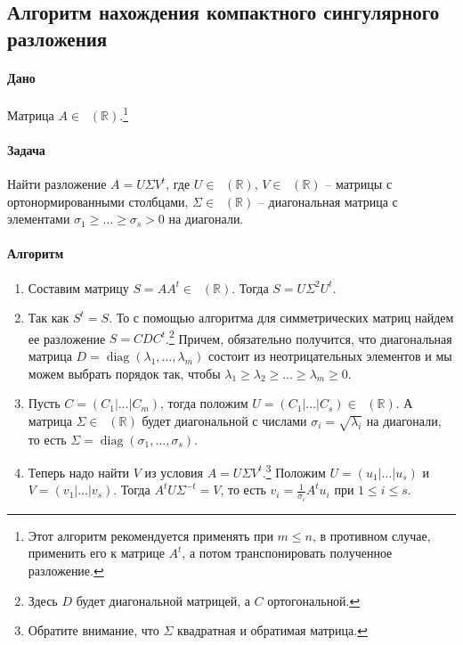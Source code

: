 \documentclass{article}
\newcommand{\MatrixDim}[3]{\mathop{\mathrm{M}_{#2\,#3}}(#1)}
\newcommand{\Matrix}[2]{\mathop{\mathrm{M}_{#2}}(#1)}
\newcommand{\diag}{\operatorname{diag}}
\begin{document}
\subsection{Алгоритм нахождения компактного сингулярного разложения}

\paragraph{Дано} Матрица $A \in \MatrixDim{\mathbb R}{m}{n}$.\footnote{Этот алгоритм рекомендуется применять при $m\leqslant n$, в противном случае, применить его к матрице $A^t$, а потом транспонировать полученное разложение.}

\paragraph{Задача} Найти разложение $A = U \Sigma V^t$, где $U\in\MatrixDim{\mathbb R}{m}{s}$, $V\in\MatrixDim{\mathbb R}{n}{s}$ -- матрицы с ортонормированными столбцами, $\Sigma \in\Matrix{\mathbb R}{s}$ -- диагональная матрица с элементами $\sigma_1\geqslant\ldots\geqslant \sigma_s>0$ на диагонали.

\paragraph{Алгоритм}
\begin{enumerate}
\item Составим матрицу $S = A A^t\in\Matrix{\mathbb R}{m}$. Тогда $S = U \Sigma^2 U^t$. 

\item Так как $S^t = S$. То с помощью алгоритма для симметрических матриц найдем ее разложение $S = C D C^t$.\footnote{Здесь $D$ будет диагональной матрицей, а $C$ ортогональной.} Причем, обязательно получится, что диагональная матрица $D=\diag(\lambda_1,\ldots,\lambda_m)$ состоит из неотрицательных элементов и мы можем выбрать порядок так, чтобы $\lambda_1 \geqslant \lambda_2\geqslant\ldots \geqslant \lambda_m\geqslant 0$.

\item Пусть $C = (C_1|\ldots|C_m)$, тогда положим $U = (C_1|\ldots|C_s)\in\MatrixDim{\mathbb R}{m}{s}$. А матрица $\Sigma\in \Matrix{\mathbb R}{s}$ будет диагональной с числами $\sigma_i = \sqrt{\lambda_i}$ на диагонали, то есть $\Sigma = \diag(\sigma_1,\ldots,\sigma_s)$.

\item Теперь надо найти $V$ из условия $A = U\Sigma V^t$.\footnote{Обратите внимание, что $\Sigma$ квадратная и обратимая матрица.} Положим $U=(u_1|\ldots|u_s)$ и $V = (v_1|\ldots|v_s)$. Тогда $A^t U \Sigma^{-t} = V$, то есть $v_i = \frac{1}{\sigma_i}A^t u_i$ при $1\leqslant i\leqslant s$.

\end{enumerate}
\end{document}
